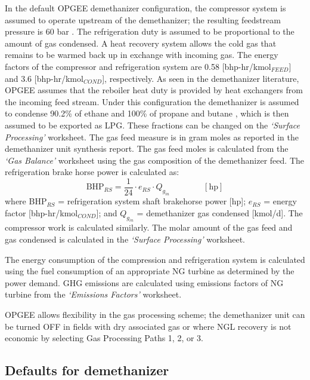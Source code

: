 \documentclass[11pt]{report}
\newcommand{\sheet}[1]{\textit{`{#1}'}}
\newcommand{\eqnunit}[1]{\quad\quad \scriptstyle{\left[\text{#1}\right]}}
\begin{document}
In the default OPGEE demethanizer configuration, the compressor system is assumed to operate upstream of the demethanizer; the resulting feedstream pressure is 60 bar \cite{Nawaz2010}. The refrigeration duty is assumed to be proportional to the amount of gas condensed. A heat recovery system allows the cold gas that remains to be warmed back up in exchange with incoming gas. The energy factors of the compressor and refrigeration system are 0.58 [bhp-hr/kmol$_{FEED}$] and 3.6 [bhp-hr/kmol$_{COND}$], respectively. As seen in the demethanizer literature, OPGEE assumes that the reboiler heat duty is provided by heat exchangers from the incoming feed stream. Under this configuration the demethanizer is assumed to condense 90.2\% of ethane and 100\% of propane and butane \cite{Nawaz2010}, which is then assumed to be exported as LPG. These fractions can be changed on the \sheet{Surface Processing} worksheet. The gas feed measure is in gram moles as reported in the demethanizer unit synthesis report. The gas feed moles is calculated from the \sheet{Gas Balance} worksheet using the gas composition of the demethanizer feed. The refrigeration brake horse power is calculated as:
\begin{equation} \label{eq:BHP_refrigeration}
\text{BHP}_{RS} = \frac{1}{24}\cdot e_{RS} \cdot Q_{g_{in}} \quad
\quad \eqnunit{hp}
\end{equation}
where BHP$_{RS}$ = refrigeration system shaft brakehorse power [hp]; $e_{RS}$ = energy factor [bhp-hr/kmol$_{COND}$]; and $Q_{g_{in}}$ = demethanizer gas condensed [kmol/d]. The compressor work is calculated similarly. The molar amount of the gas feed and gas condensed is calculated in the \sheet{Surface Processing} worksheet. \par
The energy consumption of the compression and refrigeration system is calculated using the fuel consumption of an appropriate NG turbine as determined by the power demand. GHG emissions are calculated using emissions factors of NG turbine from the \sheet{Emissions Factors} worksheet.\par
OPGEE allows flexibility in the gas processing scheme; the demethanizer unit can be turned OFF in fields with dry associated gas or where NGL recovery is not economic by selecting Gas Processing Paths 1, 2, or 3.

\subsection{Defaults for demethanizer}
\end{document}
